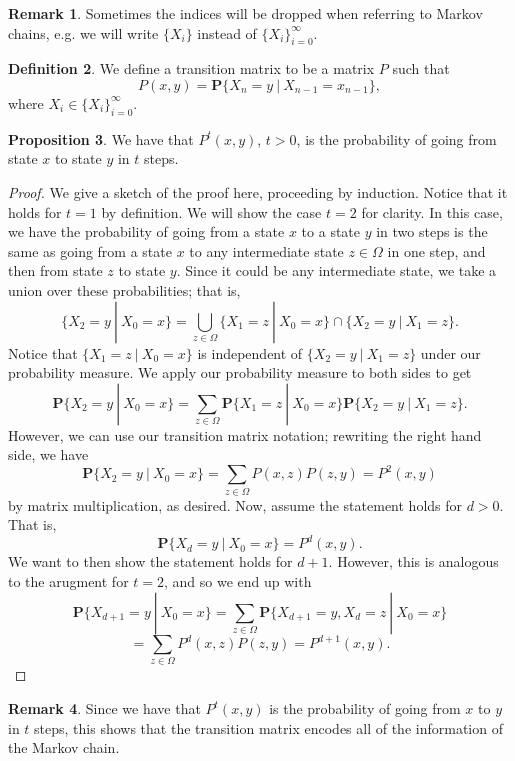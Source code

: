 \documentclass[10pt,a4paper]{amsart}
\theoremstyle{definition}
\newtheorem{definition}{Definition}
\numberwithin{definition}{section}
\newtheorem{remark}[definition]{Remark}
\newtheorem{proposition}[definition]{Proposition}
\begin{document}
\begin{remark}
Sometimes the indices will be dropped when referring to Markov chains, e.g. we will write $\{X_i\}$ instead of $\{X_i\}_{i=0}^{\infty}$. 
\end{remark}

\begin{definition}
We define a transition matrix to be a matrix $P$ such that 
\[ P(x,y) = \mathbf{P} \{X_n = y \ | \ X_{n-1} = x_{n-1}\}, \]    
where $X_i \in \{X_i\}_{i=0}^{\infty}$. 
\end{definition}

\begin{proposition}
We have that $P^t(x,y)$, $t > 0$, is the probability of going from state $x$ to state $y$ in $t$ steps.
\end{proposition}

\begin{proof}
We give a sketch of the proof here, proceeding by induction. Notice that it holds for $t = 1$ by definition. We will show the case $t=2$ for clarity. In this case, we have the probability of going from a state $x$ to a state $y$ in two steps is the same as going from a state $x$ to any intermediate state $z \in \Omega$ in one step, and then from state $z$ to state $y$. Since it could be any intermediate state, we take a union over these probabilities; that is,
\[ \{X_2 = y \ | \ X_0 = x\} = \bigcup_{z \in \Omega} \{X_{1} = z \ | \ X_{0} = x\} \cap \{X_{2} = y \ | \ X_{1} = z\}. \]
Notice that $\{X_1 = z \ | \ X_0 = x\}$ is independent of $\{X_2 = y \ | \ X_1 = z\}$ under our probability measure. We apply our probability measure to both sides to get 
\[ \mathbf{P} \{X_2 = y \ | \ X_0 = x \} = \sum_{z \in \Omega} \mathbf{P} \{X_{1} = z \ | \ X_0 = x\} \mathbf{P} \{X_2 = y \ | \ X_1 = z\}.\]
However, we can use our transition matrix notation; rewriting the right hand side, we have
\[ \mathbf{P} \{X_2 = y \ | \ X_0 =x \} = \sum_{z \in \Omega} P(x,z)P(z,y) = P^2(x,y) \]
by matrix multiplication, as desired. Now, assume the statement holds for $d > 0$. That is, 
\[ \mathbf{P} \{X_d = y \ | \ X_0 = x\} = P^d(x,y).\]
We want to then show the statement holds for $d+1$. However, this is analogous to the arugment for $t=2$, and so we end up with
\[ \mathbf{P} \{X_{d+1} = y \ | \ X_0 = x \} = \sum_{z \in \Omega} \mathbf{P} \{X_{d+1} = y, X_d = z \ | \ X_0 = x\}\]
\[ = \sum_{z \in \Omega} P^d(x,z)P(z,y) = P^{d+1}(x,y).\]
\end{proof}

\begin{remark}
Since we have that $P^t(x,y)$ is the probability of going from $x$ to $y$ in $t$ steps, this shows that the transition matrix encodes all of the information of the Markov chain.
\end{remark}
\end{document}

